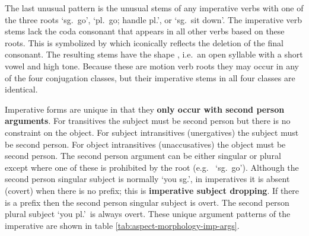 \begin{multicols}{2}
The last unusual pattern is the unusual stems of any imperative verbs with one of the three roots  ‘sg.\ go’,  ‘pl.\ go; handle pl.’, or  ‘sg.\ sit down’.
The imperative verb stems lack the coda consonant that appears in all other verbs based on these roots.
This is symbolized by  which iconically reflects the deletion of the final consonant.
The resulting stems have the shape , i.e.\ an open syllable with a short vowel and high tone.
Because these are motion verb roots they may occur in any of the four conjugation classes, but their imperative stems in all four classes are identical.

Imperative forms are unique in that they \textbf{only occur with second person arguments}.
For transitives the subject must be second person but there is no constraint on the object.
For subject intransitives (unergatives) the subject must be second person.
For object intransitives (unaccusatives) the object must be second person.
The second person argument can be either singular or plural except where one of these is prohibited by the root (e.g.\  ‘sg.\ go’).
Although the second person singular subject is normally  ‘you sg.’, in imperatives it is absent (covert) when there is no  prefix; this is \textbf{imperative subject dropping}.
If there is a  prefix then the second person singular subject  is overt.
The second person plural subject  ‘you pl.’\ is always overt.
These unique argument patterns of the imperative are shown in table \ref{tab:aspect-morphology-imp-args}.
\end{multicols}

